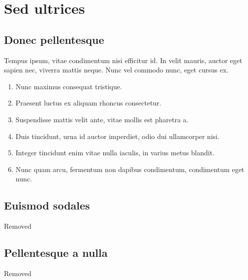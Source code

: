 \section{Sed ultrices} \label{sec:sed-ultrices}

\subsection{Donec pellentesque}

Tempus ipsum, vitae condimentum nisi efficitur id. In velit mauris, auctor eget
sapien nec, viverra mattis neque. Nunc vel commodo nunc, eget cursus ex.

\begin{enumerate}
\item{Nunc maximus consequat tristique.}
\item{Praesent luctus ex aliquam rhoncus consectetur.}
\item{Suspendisse mattis velit ante, vitae mollis est pharetra a.}
\item{Duis tincidunt, urna id auctor imperdiet, odio dui ullamcorper nisi.}
\item{Integer tincidunt enim vitae nulla iaculis, in varius metus blandit.}
\item{Nunc quam arcu, fermentum non dapibus condimentum, condimentum eget nunc.}
\end{enumerate}

\subsection{Euismod sodales}

Removed

\subsection{Pellentesque a nulla}

Removed
